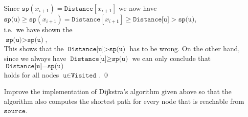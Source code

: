 \begin{enumerate}
      Since $\texttt{sp}(x_{i+1}) = \texttt{Distance}[x_{i+1}]$ we now have 
      \\[0.2cm]
      \hspace*{1.3cm} 
      $\texttt{sp(u)} \geq \texttt{sp}(x_{i+1}) = \texttt{Distance}[x_{i+1}] \geq \texttt{Distance[u]} > \texttt{sp(u)}$,
      \\[0.2cm]
      i.e.~we have shown the 
      \\[0.2cm]
      \hspace*{1.3cm}
      $\texttt{sp(u)} > \texttt{sp(u)}$,
      \\[0.2cm]
      This shows that the  $\texttt{Distance[u]} > \texttt{sp(u)}$ has to be wrong.  On the
      other hand, since we always have $\texttt{Distance[u]} \geq \texttt{sp(u)}$ we can only conclude that
      \\[0.2cm]
      \hspace*{1.3cm}
      $\texttt{Distance[u]} = \texttt{sp(u)}$
      \\[0.2cm]
      holds for all nodes $\texttt{u} \in \texttt{Visited}$. \qed
\end{enumerate}

\exercise
Improve the implementation of Dijkstra's algorithm given above so that the algorithm also computes
the shortest path for every node that is reachable from $\texttt{source}$.
\eox


